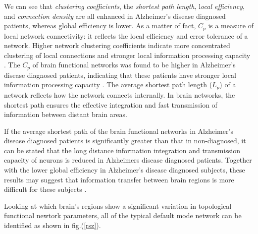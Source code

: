 \documentclass[12pt,openright,twoside,a4paper]{book}
\begin{document}
\vspace{5mm}

We can see that \textit{clustering coefficients}, the \textit{shortest path length}, l\textit{ocal efficiency}, and \textit{connection density} are all enhanced in Alzheimer's disease diagnosed patients, whereas global efficiency is lower. 
As a matter of fact, $C_p$ is a measure of local network connectivity: it reflects the local efficiency and error tolerance of a network. 
Higher network clustering coefficients indicate more concentrated clustering of local connections and stronger local information processing capacity \cite{Rest-NTW}.
The $C_p$ of brain functional networks was found to be higher in Alzheimer's disease diagnosed patients, indicating that these patients have stronger local information processing capacity \cite{ssa}.
The average shortest path length ($L_p$) of a network reflects how the network connects internally. In brain networks, the shortest path ensures the effective integration and fast transmission of information between distant brain areas.

If the average shortest path of the brain functional networks in Alzheimer's disease diagnosed patients is significantly greater than that in non-diagnosed, it can be stated that the long distance information integration and transmission capacity of neurons is reduced in Alzheimers disease diagnosed patients.
Together with the lower global efficiency in Alzheimer's disease diagnosed subjects, these results may suggest that information transfer between brain regions is more difficult for these subjects \cite{ssa}.

Looking at which  brain's regions show a significant variation in topological functional newtork parameters, all of the typical default mode network can be identified as shown in fig.(\ref{rsz}).
\end{document}
